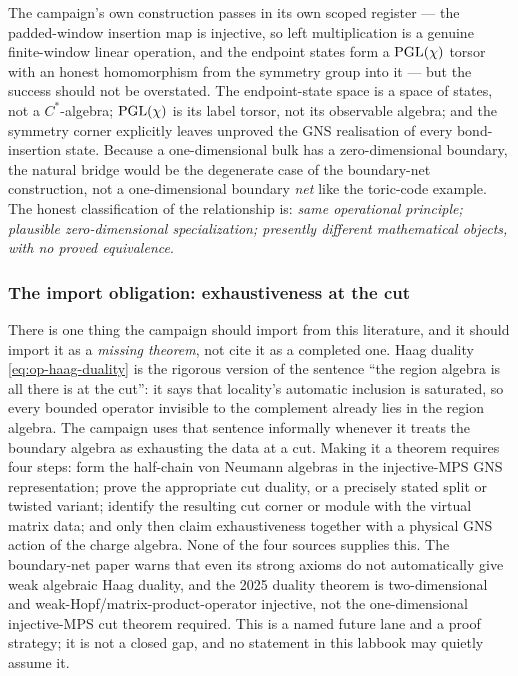 The campaign's own construction passes in its own scoped register --- the
padded-window insertion map is injective, so left multiplication is a genuine
finite-window linear operation, and the endpoint states form a $\mathrm{PGL}(\chi)$
torsor with an honest homomorphism from the symmetry group into it --- but the
success should not be overstated. The endpoint-state space is a space of
states, not a $C^*$-algebra; $\mathrm{PGL}(\chi)$ is its label torsor, not its
observable algebra; and the symmetry corner explicitly leaves unproved the GNS
realisation of every bond-insertion state. Because a one-dimensional bulk has a
zero-dimensional boundary, the natural bridge would be the degenerate case of
the boundary-net construction, not a one-dimensional boundary \emph{net} like
the toric-code example. The honest classification of the relationship is:
\emph{same operational principle; plausible zero-dimensional specialization;
presently different mathematical objects, with no proved equivalence}.

\subsubsection*{The import obligation: exhaustiveness at the cut}

There is one thing the campaign should import from this literature, and it
should import it as a \emph{missing theorem}, not cite it as a completed one.
Haag duality \eqref{eq:op-haag-duality} is the rigorous version of the sentence
``the region algebra is all there is at the cut'': it says that locality's
automatic inclusion is saturated, so every bounded operator invisible to the
complement already lies in the region algebra. The campaign uses that sentence
informally whenever it treats the boundary algebra as exhausting the data at a
cut. Making it a theorem requires four steps: form the half-chain von Neumann
algebras in the injective-MPS GNS representation; prove the appropriate cut
duality, or a precisely stated split or twisted variant; identify the resulting
cut corner or module with the virtual matrix data; and only then claim
exhaustiveness together with a physical GNS action of the charge algebra. None
of the four sources supplies this. The boundary-net paper warns that even its
strong axioms do not automatically give weak algebraic Haag duality, and the
2025 duality theorem is two-dimensional and weak-Hopf/matrix-product-operator
injective, not the one-dimensional injective-MPS cut theorem required. This is
a named future lane and a proof strategy; it is not a closed gap, and no
statement in this labbook may quietly assume it.

